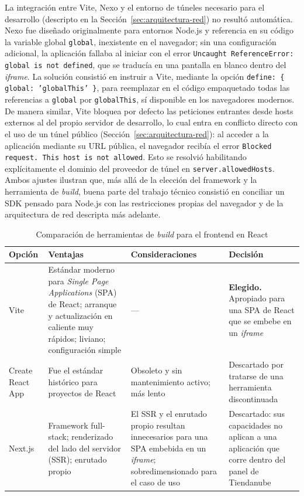 La integración entre Vite, Nexo y el entorno de túneles necesario para el desarrollo (descripto en la Sección~\ref{sec:arquitectura-red}) no resultó automática. Nexo fue diseñado originalmente para entornos Node.js y referencia en su código la variable global \texttt{global}, inexistente en el navegador; sin una configuración adicional, la aplicación fallaba al iniciar con el error \texttt{Uncaught ReferenceError: global is not defined}, que se traducía en una pantalla en blanco dentro del \emph{iframe}. La solución consistió en instruir a Vite, mediante la opción \texttt{define: \{ global: 'globalThis' \}}, para reemplazar en el código empaquetado todas las referencias a \texttt{global} por \texttt{globalThis}, sí disponible en los navegadores modernos. De manera similar, Vite bloquea por defecto las peticiones entrantes desde hosts externos al del propio servidor de desarrollo, lo cual entra en conflicto directo con el uso de un túnel público (Sección~\ref{sec:arquitectura-red}): al acceder a la aplicación mediante su URL pública, el navegador recibía el error \texttt{Blocked request. This host is not allowed}. Esto se resolvió habilitando explícitamente el dominio del proveedor de túnel en \texttt{server.allowedHosts}. Ambos ajustes ilustran que, más allá de la elección del framework y la herramienta de \emph{build}, buena parte del trabajo técnico consistió en conciliar un SDK pensado para Node.js con las restricciones propias del navegador y de la arquitectura de red descripta más adelante.

\begin{table}[h]
\centering
\caption{Comparación de herramientas de \emph{build} para el frontend en React}
\label{tab:comparativo_bundler}
\renewcommand{\arraystretch}{1.3}
\begin{tabular}{|m{2.3cm}|m{4.4cm}|m{4.4cm}|m{3.4cm}|}
\hline
\textbf{Opción} & \textbf{Ventajas} & \textbf{Consideraciones} & \textbf{Decisión} \\
\hline
Vite & Estándar moderno para \emph{Single Page Applications} (SPA) de React; arranque y actualización en caliente muy rápidos; liviano; configuración simple & --- & \textbf{Elegido.} Apropiado para una SPA de React que se embebe en un \emph{iframe} \\
\hline
Create React App & Fue el estándar histórico para proyectos de React & Obsoleto y sin mantenimiento activo; más lento & Descartado por tratarse de una herramienta discontinuada \\
\hline
Next.js & Framework full-stack; renderizado del lado del servidor (SSR); enrutado propio & El SSR y el enrutado propio resultan innecesarios para una SPA embebida en un \emph{iframe}; sobredimensionado para el caso de uso & Descartado: sus capacidades no aplican a una aplicación que corre dentro del panel de Tiendanube \\
\hline
\end{tabular}
\end{table}

